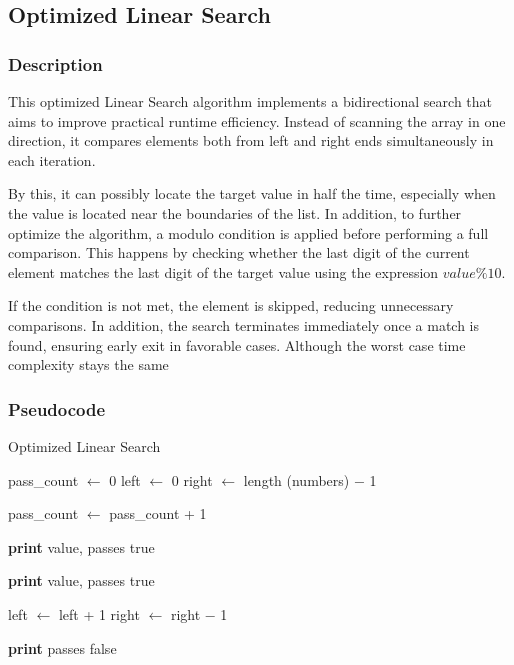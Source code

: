 \subsection{Optimized Linear Search}

\subsubsection{Description}

This optimized Linear Search algorithm implements a bidirectional search that aims to improve practical runtime efficiency. Instead of scanning the array in one direction, it compares elements both from left and right ends simultaneously in each iteration. 

By this, it can possibly locate the target value in half the time, especially when the value is located near the boundaries of the list. In addition, to further optimize the algorithm,  a modulo condition is applied before performing a full comparison. This happens by checking whether the last digit of the current element matches the last digit of the target value using the expression $value \% 10$.

If the condition is not met, the element is skipped, reducing unnecessary comparisons. In addition, the search terminates immediately once a match is found, ensuring early exit in favorable cases. Although the worst case time complexity stays the same %

\subsubsection{Pseudocode}
\begin{algorithm}[H]
	\caption{Optimized Linear Search}
	\begin{algorithmic}
		\State{} pass\_count $\gets$ 0
		\State{} left $\gets$ 0
		\State{} right $\gets$ length (numbers) $-$ 1
		
			\State{} pass\_count $\gets$ pass\_count + 1
			
					\State{} \textbf{print} value, passes
					\State{} \Return{} true
				\EndIf{}
			\EndIf{}
			
						\State{} \textbf{print} value, passes
						\State{} \Return{} true
					\EndIf{}
				\EndIf{}
			\EndIf{}
			
			\State{} left $\gets$ left + 1
			\State{} right $\gets$ right $-$ 1
		\EndWhile{}
		
		\State{} \textbf{print} passes
		\State{} \Return{} false
	\EndProcedure{}
	\end{algorithmic}
	\end{algorithm}
	

